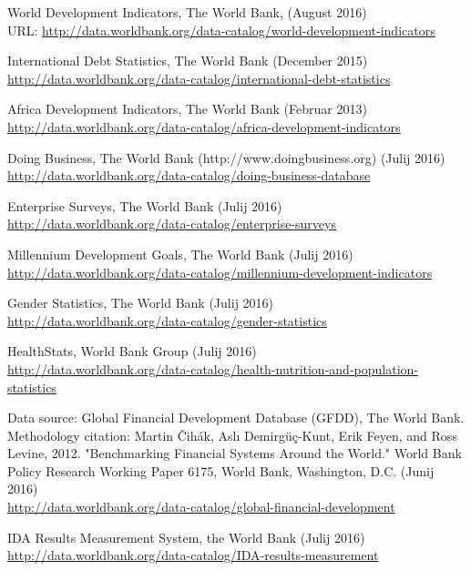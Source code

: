 \begin{thebibliography}{1}


 World Development Indicators, The World Bank, (August 2016)
\\ URL: \url{http://data.worldbank.org/data-catalog/world-development-indicators}

 International Debt Statistics, The World Bank (December 2015) 
\\ \url{http://data.worldbank.org/data-catalog/international-debt-statistics}

 Africa Development Indicators, The World Bank (Februar 2013)
\\ \url{http://data.worldbank.org/data-catalog/africa-development-indicators}

 Doing Business, The World Bank (http://www.doingbusiness.org) (Julij 2016)
\\ \url{http://data.worldbank.org/data-catalog/doing-business-database}

 Enterprise Surveys, The World Bank (Julij 2016)
\\ \url{http://data.worldbank.org/data-catalog/enterprise-surveys}

 Millennium Development Goals, The World Bank (Julij 2016)
\\ \url{http://data.worldbank.org/data-catalog/millennium-development-indicators}

 Gender Statistics, The World Bank (Julij 2016)
\\ \url{http://data.worldbank.org/data-catalog/gender-statistics}

 HealthStats, World Bank Group (Julij 2016)
\\ \url{http://data.worldbank.org/data-catalog/health-nutrition-and-population-statistics}

 Data source: Global Financial Development Database (GFDD), The World Bank. Methodology citation: Martin Čihák, Aslı Demirgüç-Kunt, Erik Feyen, and Ross Levine, 2012. "Benchmarking Financial Systems Around the World." World Bank Policy Research Working Paper 6175, World Bank, Washington, D.C. (Junij 2016)
\\ \url{http://data.worldbank.org/data-catalog/global-financial-development}

 IDA Results Measurement System, the World Bank (Julij 2016)
\\ \url{http://data.worldbank.org/data-catalog/IDA-results-measurement}




\end{thebibliography}



